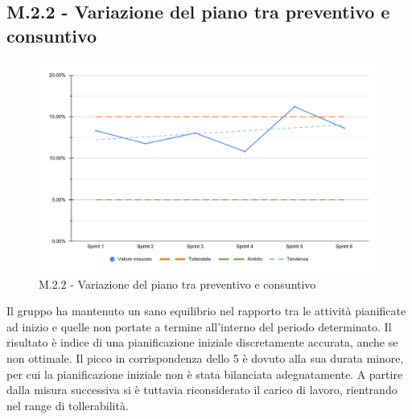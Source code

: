 \subsection{M.2.2 - Variazione del piano tra preventivo e consuntivo}
\begin{figure}[H]
    \centering
    \includegraphics[width=\textwidth]{assets/variazione_task_completati.pdf}
    \caption{M.2.2 - Variazione del piano tra preventivo e consuntivo}
\end{figure}

\par Il gruppo ha mantenuto un sano equilibrio nel rapporto tra le attività pianificate ad inizio  e quelle non portate a termine all'interno del periodo determinato. Il risultato è indice di una pianificazione iniziale discretamente accurata, anche se non ottimale. Il picco in corrispondenza dello  5 è dovuto alla sua durata minore, per cui la pianificazione iniziale non è stata bilanciata adeguatamente. A partire dalla misura successiva si è tuttavia riconsiderato il carico di lavoro, rientrando nel range di tollerabilità.